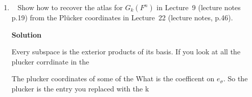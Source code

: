 \documentclass[11pt]{article}
\newcommand\score[1]{\marginpar{\vspace{-2ex}\color{blue}{#1/3}}\hspace{-1ex}}
\newcommand\0{\mathbf{0}}
\newcommand\<{\langle}
\renewcommand\>{\rangle}
\begin{document}
\begin{enumerate}
\textbf{Solution}

Define $\wedge_{[\perp]}(\sigma_{r},\sigma_{s})=[\sigma_{r} \perp \sigma_{s}](-1)^{inv(\sigma_{r},\sigma_{s})mod 2} \sigma_{r}\wedge \sigma_{s}$.
This function evalues to zero if the two inputs are dependent(in this case it checks if there are two of the same basis vectors using the Iverson bracket), it also accounts for 
the sign of the parity of the ordering.

Define $f$ as $(v^{r},v^{s}) \mapsto ((a_{1}\sigma^{r}_{1})+\cdots+(a_{\binom{[n]}{r}} \sigma^{r}_{\binom{[n]}{r}})) \wedge_{[\perp]} ((a_{1}\sigma^{s}_{1})+\cdots+(a_{\binom{[n]}{s}} \sigma^{r}_{\binom{[n]}{s}}))$, where $n$ is the dimension of $V$.

$f$ is bilinear since the the wedge itself is a bilinear operator.

$\omega' \wedge \omega = (-1)^{rs} \omega \wedge \omega'$ because $rs$ is the total change in the number of inversions, 
and since we only care about the parity, $x-y\equiv x+y$ therefore we only need to care about the aboslute value of inversions that were both 
created and destroyed, this value is $rs$ because for every vector in $\omega$ it has swapped orientation with every vector in $\omega^{'}$, therefore there are 
a total of $rs$ changes in orientaiton.

\item\ \score{}%
Show how to recover the atlas for $G_k(F^n)$ in Lecture~9 (lecture
notes p.19) from the Pl\"ucker coordinates in Lecture~22 (lecture
notes, p.46).

\textbf{Solution}

Every subspace is the exterior products of its basis.
If you look at all the plucker corrdinate in the

The plucker coordinates of some of the 
What is the coefficent on $e_{\sigma}$. So the plucker is the entry you 
replaced with the k

\end{enumerate}


\end{document}
